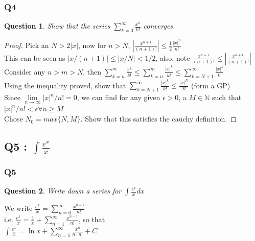 \documentclass[handout,aspectratio=169]{beamer}
\newtheorem{qsn}{Question}
\newcommand{\bN}{\mathbb{N}}
\begin{document}
\begin{frame}
\frametitle{Q4}
\begin{qsn}
Show that the series $\sum_{k=0}^\infty \frac{x^k}{k!}$ converges.
\end{qsn}
\pause
\begin{proof}
Pick an $N>2|x|$, now for $n>N$, $\left|\frac{x^{n+1}}{(n+1)!}\right| \leq \frac{1}{2} \frac{|x|^n}{n!}$ \\ 
This can be seen as $|x/(n+1)| \leq |x/N| <1/2$, also, note $\frac{x^{n+1}}{(n+1)!} \leq \left|\frac{x^{n+1}}{(n+1)!}\right|$\\
Consider any $n>m>N$, then $\sum\limits_{k=n}^m \frac{x^k}{k!} \leq \sum\limits_{k=n}^m \frac{|x|^k}{k!} \leq \sum\limits_{k=N+1}^\infty\frac{|x|^k}{k!}$ \\ \pause
Using the inequality proved, show that $\sum\limits_{k=N+1}^\infty\frac{|x|^k}{k!}\leq \frac{|x|^N}{N!}$ (form a GP) \\ \pause
Since $\lim\limits_{n\to\infty} |x|^n/n! = 0$, we can find for any given $\epsilon>0$, a $M \in \bN$ such that $|x|^n/n! < \epsilon \forall n\geq M$ \\
Chose $N_0 = max\{N,M\}$. Show that this satisfies the cauchy definition.
\end{proof}
\end{frame}

\subsection{Q5 : $\int \frac{e^x}{x}$}

\begin{frame}
\frametitle{Q5}
\begin{qsn}
Write down a series for $\int \frac{e^x}{x}dx$
\end{qsn}
\pause
We write $\frac{e^x}{x} = \sum\limits_{n=0}^\infty \frac{x^{n-1}}{n!}$ \\ \pause
i.e. $\frac{e^x}{x} = \frac{1}{x}+\sum\limits_{n=1}^\infty \frac{x^{n-1}}{n!}$, so that \\
$\int \frac{e^x}{x} = \ln x + \sum\limits_{n=1}^\infty \frac{x^n}{n\cdot n!} + C$
\end{frame}
\end{document}
